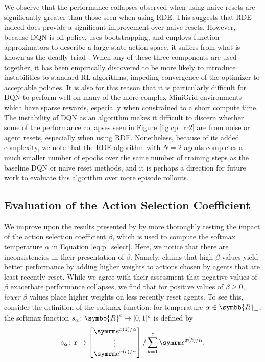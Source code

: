\documentclass[base]{subfiles}
\begin{document}
We observe that the performance collapses observed when using naive resets are significantly greater than those seen when using RDE.
This suggests that RDE indeed does provide a significant improvement over naive resets.
However, because DQN is off-policy, uses bootstrapping, and employs function approximators to describe a large state-action space, it suffers from what is known as the deadly triad \cite{hasselt2018}.
When any of these three components are used together, it has been empirically discovered to be more likely to introduce instabilities to standard RL algorithms, impeding convergence of the optimizer to acceptable policies.
It is also for this reason that it is particularly difficult for DQN to perform well on many of the more complex MiniGrid environments which have sparse rewards, especially when constrained to a short compute time.
The instability of DQN as an algorithm makes it difficult to discern whether some of the performance collapses seen in Figure \ref{fig:cp_rr2} are from noise or agent resets, especially when using RDE.
Nonetheless, because of its added complexity, we note that the RDE algorithm with $N=2$ agents completes a much smaller number of epochs over the same number of training steps as the baseline DQN or naive reset methods, and it is perhaps a direction for future work to evaluate this algorithm over more episode rollouts.

\subsection{Evaluation of the Action Selection Coefficient}
\label{ssec:errors}

We improve upon the results presented by \cite{kim2023} by more thoroughly testing the impact of the action selection coefficient $\beta$, which is used to compute the softmax temperature $\alpha$ in Equation \ref{eq:p_select}.
Here, we notice that there are inconsistencies in their presentation of $\beta$.
Namely, \cite{kim2023} claims that high $\beta$ values yield better performance by adding higher weights to actions chosen by agents that are least recently reset.
While we agree with their assessment that negative values of $\beta$ exacerbate performance collapses, we find that for positive values of $\beta \ge 0$, \textit{lower} $\beta$ values place higher weights on less recently reset agents.
To see this, consider the definition of the softmax function: 
for temperature \(\alpha \in \symbb{R}_+\), the softmax function \(s_{\alpha} \colon \symbb{R}^c \to [0,1]^c\) is defined by
\begin{equation*}
	s_{\alpha} \colon x \mapsto \begin{bmatrix}
		\e^{x(1) / \alpha} \\
		\vdots          \\
		\e^{x(c) / \alpha}
	\end{bmatrix} / \sum_{k=1}^c \e^{x(k) / \alpha}.
\end{equation*}
\end{document}
